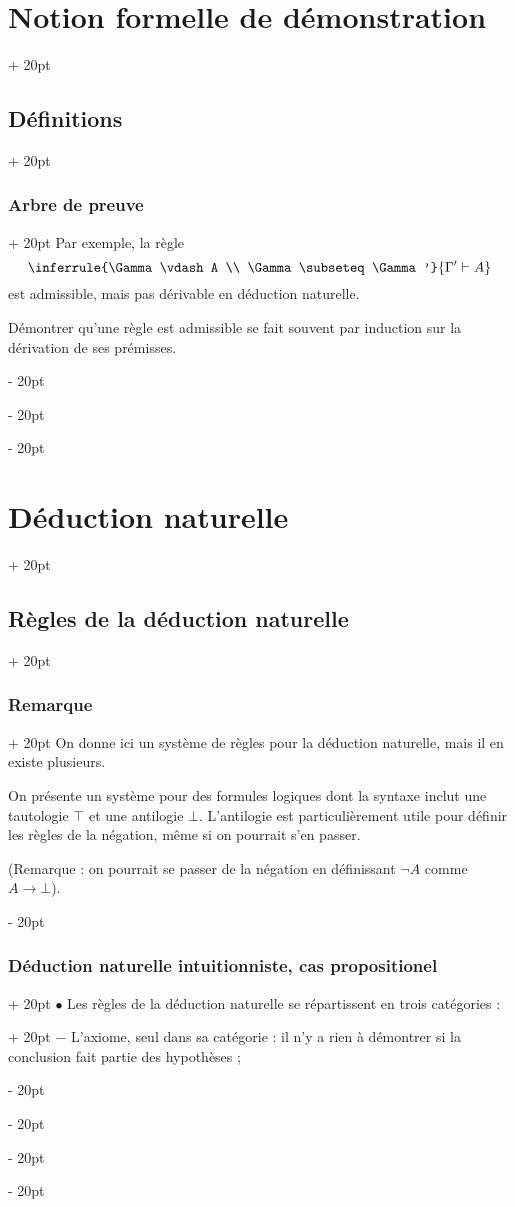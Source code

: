 \documentclass[a4paper, 12pt, twoside]{article}
\newcommand{\ind}[1][20pt]{\advance\leftskip + #1}
\newcommand{\deind}[1][20pt]{\advance\leftskip - #1}
\newenvironment{indt}[2][20pt]{#2 \par \ind[#1]}{\par \deind} %
\begin{document}
\begin{indt}{\section{Notion formelle de démonstration}}
\begin{indt}{\subsection{Définitions}}
\begin{indt}{\subsubsection{Arbre de preuve}}
                Par exemple, la règle
                \[
                    \inferrule{\Gamma \vdash A \\ \Gamma \subseteq \Gamma'}{\Gamma' \vdash A}
                \]
                est admissible, mais pas dérivable en déduction naturelle.

                Démontrer qu'une règle est admissible se fait souvent par induction sur la dérivation de ses prémisses.
            \end{indt}
        \end{indt}
    \end{indt}

    \vspace{12pt}
    
    \begin{indt}{\section{Déduction naturelle}}
        \begin{indt}{\subsection{Règles de la déduction naturelle}}
            \begin{indt}{\subsubsection{Remarque}}
                On donne ici un système de règles pour la déduction naturelle, mais il en existe plusieurs.

                On présente un système pour des formules logiques dont la syntaxe inclut une tautologie $\top$ et une antilogie $\bot$.
                L'antilogie est particulièrement utile pour définir les règles de la négation, même si on pourrait s'en passer.

                (Remarque : on pourrait se passer de la négation en définissant $\neg A$ comme $A \rightarrow \bot$).
            \end{indt}

            \vspace{12pt}
            
            \begin{indt}{\subsubsection{Déduction naturelle intuitionniste, cas propositionel}}
                \begin{indt}{$\bullet$ Les règles de la déduction naturelle se répartissent en trois catégories :}
                    $-$ L'axiome, seul dans sa catégorie : il n'y a rien à démontrer si la conclusion fait partie des hypothèses ;


\end{indt}
\end{indt}
\end{indt}
\end{indt}
\end{document}
